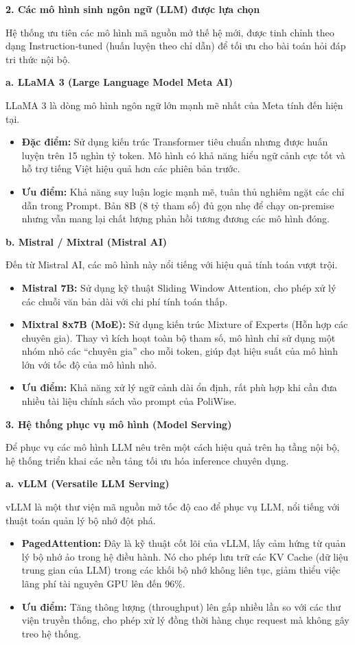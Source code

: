 \documentclass[12pt,a4paper]{report}
\begin{document}
\textbf{2. Các mô hình sinh ngôn ngữ (LLM) được lựa chọn}

Hệ thống ưu tiên các mô hình mã nguồn mở thế hệ mới, được tinh chỉnh theo dạng Instruction-tuned (huấn luyện theo chỉ dẫn) để tối ưu cho bài toán hỏi đáp tri thức nội bộ.

\textbf{a. LLaMA 3 (Large Language Model Meta AI)}

LLaMA 3 là dòng mô hình ngôn ngữ lớn mạnh mẽ nhất của Meta tính đến hiện tại.
\begin{itemize}
    \item \textbf{Đặc điểm:} Sử dụng kiến trúc Transformer tiêu chuẩn nhưng được huấn luyện trên 15 nghìn tỷ token. Mô hình có khả năng hiểu ngữ cảnh cực tốt và hỗ trợ tiếng Việt hiệu quả hơn các phiên bản trước.
    \item \textbf{Ưu điểm:} Khả năng suy luận logic mạnh mẽ, tuân thủ nghiêm ngặt các chỉ dẫn trong Prompt. Bản 8B (8 tỷ tham số) đủ gọn nhẹ để chạy on-premise nhưng vẫn mang lại chất lượng phản hồi tương đương các mô hình đóng.
\end{itemize}

\textbf{b. Mistral / Mixtral (Mistral AI)}

Đến từ Mistral AI, các mô hình này nổi tiếng với hiệu quả tính toán vượt trội.
\begin{itemize}
    \item \textbf{Mistral 7B:} Sử dụng kỹ thuật Sliding Window Attention, cho phép xử lý các chuỗi văn bản dài với chi phí tính toán thấp.
    \item \textbf{Mixtral 8x7B (MoE):} Sử dụng kiến trúc Mixture of Experts (Hỗn hợp các chuyên gia). Thay vì kích hoạt toàn bộ tham số, mô hình chỉ sử dụng một nhóm nhỏ các ``chuyên gia'' cho mỗi token, giúp đạt hiệu suất của mô hình lớn với tốc độ của mô hình nhỏ.
    \item \textbf{Ưu điểm:} Khả năng xử lý ngữ cảnh dài ổn định, rất phù hợp khi cần đưa nhiều tài liệu chính sách vào prompt của PoliWise.
\end{itemize}

\textbf{3. Hệ thống phục vụ mô hình (Model Serving)}

Để phục vụ các mô hình LLM nêu trên một cách hiệu quả trên hạ tầng nội bộ, hệ thống triển khai các nền tảng tối ưu hóa inference chuyên dụng.

\textbf{a. vLLM (Versatile LLM Serving)}

vLLM là một thư viện mã nguồn mở tốc độ cao để phục vụ LLM, nổi tiếng với thuật toán quản lý bộ nhớ đột phá.
\begin{itemize}
    \item \textbf{PagedAttention:} Đây là kỹ thuật cốt lõi của vLLM, lấy cảm hứng từ quản lý bộ nhớ ảo trong hệ điều hành. Nó cho phép lưu trữ các KV Cache (dữ liệu trung gian của LLM) trong các khối bộ nhớ không liên tục, giảm thiểu việc lãng phí tài nguyên GPU lên đến 96\%.
    \item \textbf{Ưu điểm:} Tăng thông lượng (throughput) lên gấp nhiều lần so với các thư viện truyền thống, cho phép xử lý đồng thời hàng chục request mà không gây treo hệ thống.
\end{itemize}
\end{document}
